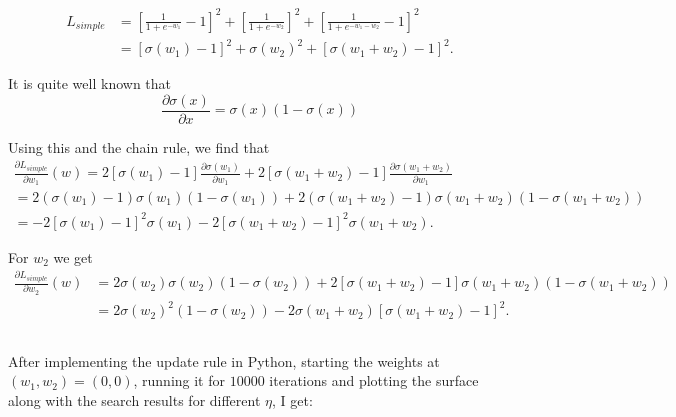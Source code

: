 \documentclass{article}
\begin{document}
\begin{align}
	L_{simple} &= \left[ \frac{1}{1 + e^{-w_1}} - 1 \right]^2 + \left[ \frac{1}{1 + e^{-w_2}} \right]^2 + \left[ \frac{1}{1 + e^{-w_1 - w_2}} - 1 \right]^2 \\
	&= \left[ \sigma(w_1) - 1 \right]^2 + \sigma(w_2)^2 + \left[ \sigma(w_1 + w_2) - 1 \right]^2.
\end{align}

It is quite well known that
\begin{equation}
	\frac{\partial \sigma(x)}{\partial x} = \sigma(x) (1 - \sigma(x))
\end{equation}

Using this and the chain rule, we find that
\begin{align}
	\frac{\partial L_{simple}}{\partial w_1}(w) = 2 \left[ \sigma(w_1) - 1 \right]  \frac{\partial \sigma(w_1)}{\partial w_1}  + 2 \left[ \sigma(w_1 + w_2) - 1 \right] \frac{\partial \sigma(w_1 + w_2)}{\partial w_1} \\
	= 2 (\sigma(w_1) - 1)\sigma(w_1)(1 - \sigma(w_1)) + 2 (\sigma(w_1 + w_2) - 1) \sigma(w_1 + w_2)(1 - \sigma(w_1+w_2)) \\
	= -2 \left[ \sigma(w_1) - 1 \right]^2\sigma(w_1) -2 \left[ \sigma(w_1 + w_2) - 1 \right]^2\sigma(w_1 + w_2).
\end{align}

For $w_2$ we get
\begin{align}
	\frac{\partial L_{simple}}{\partial w_2}(w) &= 2\sigma(w_2)\sigma(w_2)(1 - \sigma(w_2)) + 2 \left[ \sigma(w_1 + w_2) - 1 \right] \sigma(w_1+w_2)(1 - \sigma(w_1 + w_2)) \\
	&= 2 \sigma(w_2)^2(1 - \sigma(w_2)) - 2 \sigma(w_1+w_2) \left[ \sigma(w_1+w_2) - 1 \right]^2.
\end{align}

\subsection{}
After implementing the update rule in Python, starting the weights at $(w_1,w_2) = (0,0)$, running it for $10000$ iterations and plotting the surface along with the search results for different $\eta$, I get:
\end{document}
